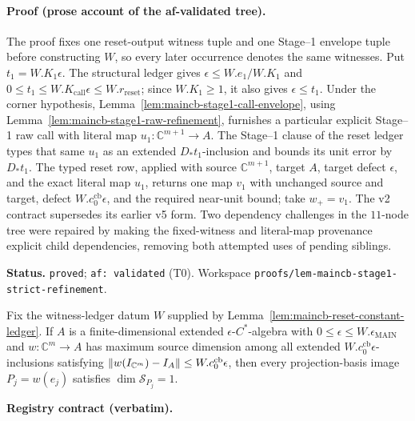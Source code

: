 \paragraph{Proof (prose account of the af-validated tree).}
The proof fixes one reset-output witness tuple and one Stage--1 envelope tuple before constructing
$W$, so every later occurrence denotes the same witnesses.  Put $t_1=W.K_1\epsilon$.  The structural
ledger gives $\epsilon\leq W.e_1/W.K_1$ and
$0\leq t_1\leq W.K_{\mathrm{call}}\epsilon\leq W.r_{\mathrm{reset}}$; since $W.K_1\geq1$, it also
gives $\epsilon\leq t_1$.  Under the corner hypothesis,
Lemma~\ref{lem:maincb-stage1-call-envelope}, using
Lemma~\ref{lem:maincb-stage1-raw-refinement}, furnishes a particular explicit Stage--1 raw call with
literal map $u_1:\mathbb C^{m+1}\to A$.  The Stage--1 clause of the reset ledger types that same
$u_1$ as an extended $D_*t_1$-inclusion and bounds its unit error by $D_*t_1$.  The typed reset row,
applied with source $\mathbb C^{m+1}$, target $A$, target defect $\epsilon$, and the exact literal map
$u_1$, returns one map $v_1$ with unchanged source and target, defect
$W.c^{\mathrm{cb}}_0\epsilon$, and the required near-unit bound; take $w_+=v_1$.
The v2 contract supersedes its earlier v5 form.  Two dependency challenges in the $11$-node tree
were repaired by making the fixed-witness and literal-map provenance explicit child dependencies,
removing both attempted uses of pending siblings.

\medskip\noindent\textbf{Status.} \texttt{proved}; \texttt{af: validated} (T0).  Workspace
\texttt{proofs/lem-maincb-stage1-strict-refinement}.

\begin{lemma}\label{lem:maincb-stage1-maximality}
Fix the witness-ledger datum $W$ supplied by Lemma~\ref{lem:maincb-reset-constant-ledger}.  If $A$
is a finite-dimensional extended $\epsilon$-$C^*$-algebra with
$0\leq\epsilon\leq W.\epsilon_{\mathrm{MAIN}}$ and $w:\mathbb C^m\to A$ has maximum source
dimension among all extended $W.c^{\mathrm{cb}}_0\epsilon$-inclusions satisfying
$\lVert w(I_{\mathbb C^m})-I_A\rVert\leq W.c^{\mathrm{cb}}_0\epsilon$, then every projection-basis image
$P_j=w(e_j)$ satisfies $\dim\mathcal S_{P_j}=1$.
\end{lemma}

\noindent\textbf{Registry contract (verbatim).}

